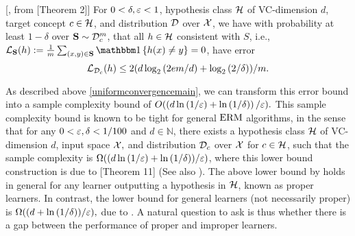 \begin{lemma}\label{uniformconvergencemain}[\cite{vapnik74theory}, \cite{Blumeruniformconvergence} from \cite{Simons}[Theorem 2]]
    For $0<\delta,\varepsilon<1$, hypothesis class $\mathcal{H}$ of VC-dimension $d$, target concept $c\in\mathcal{H}$, and distribution $\mathcal{D}$ over $\mathcal{X}$, we have with probability at least $1-\delta$ over $\mathbf{S}\sim \mathcal{D}_{c}^{m}$, that all $h\in \mathcal{H}$ consistent with $ S $, i.e.,  $\ls_{\rS}(h):= \tfrac{
        1 }{m}\sum_{(x,y)\in \rS} \ind\left\{ h(x)\not=y \right\}  =0$,
       have error  $$
       \operatorname{\mathcal{L}}_{\mathcal{D}_{c}}(h)\leq 2(d\log_{2}{\left(2em/d \right)}+\log_{2}{\left(2/\delta \right)})/m.
       $$
   \end{lemma}
   As described above \cref{uniformconvergencemain}, we can transform this error bound into a sample complexity bound of $ O(\left(d\ln{\left(1/\varepsilon\right)}+\ln{\left(1/\delta \right)}\right)/\varepsilon).$  
   This sample complexity bound is known to be tight for general $ \mathrm{ERM} $ algorithms, in the sense that for any $0< \varepsilon ,\delta<1/100$ and $ d\in\mathbb{N} $, there exists a hypothesis class $ \mathcal{H} $ of VC-dimension $ d $, input space $ \mathcal{X},$ and distribution $ \mathcal{D}_{c} $  over $ \mathcal{X} $  for $ c\in \mathcal{H} $, such that the sample complexity is $ \Omega((d\ln{\left(1/\varepsilon\right)}+\ln{\left(1/\delta \right)})/\varepsilon) $, where this lower bound construction is due to \cite{bousquet2020proper}[Theorem 11] (See also \cite{haussler1994predicting,auer2007new,simon2015almost,hanneke2016refined}). The above lower bound by \cite{bousquet2020proper} holds in general for any learner outputting a hypothesis in $ \mathcal{H} $, known as proper learners. In contrast, the lower bound for general learners (not necessarily proper) is $ \Omega((d+\ln{\left(1/\delta \right)})/\varepsilon),$ due to \cite{EHRENFEUCHT1989247}. A natural question to ask is thus whether there is a gap between the performance of proper and improper learners.

